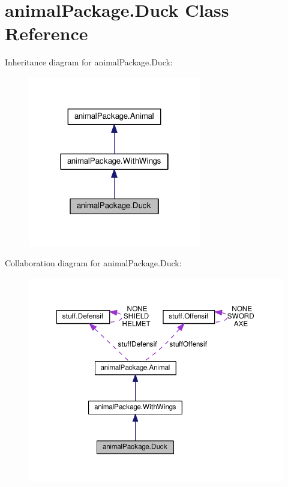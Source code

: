 \hypertarget{classanimal_package_1_1_duck}{}\section{animal\+Package.\+Duck Class Reference}
\label{classanimal_package_1_1_duck}


Inheritance diagram for animal\+Package.\+Duck\+:\nopagebreak
\begin{figure}[H]
\begin{center}
\leavevmode
\includegraphics[width=214pt]{classanimal_package_1_1_duck__inherit__graph}
\end{center}
\end{figure}


Collaboration diagram for animal\+Package.\+Duck\+:\nopagebreak
\begin{figure}[H]
\begin{center}
\leavevmode
\includegraphics[width=350pt]{classanimal_package_1_1_duck__coll__graph}
\end{center}
\end{figure}

